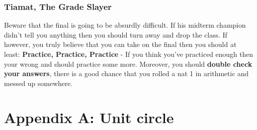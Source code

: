 \documentclass[letterpaper,10pt,twoside,twocolumn,openany]{book}
\begin{document}
\subsection{Tiamat, The Grade Slayer}
Beware that the final is going to be absurdly difficult. If his midterm champion didn't tell you anything then you should turn away and drop the class. If however, you truly believe that you can take on the final then you should at least: \textbf{Practice, Practice, Practice} - If you think you've practiced enough then your wrong and should practice some more. Moreover, you should \textbf{double check your answers}, there is a good chance that you rolled a nat 1 in arithmetic and messed up somewhere.


\onecolumn
\appendix 
\chapter{Appendix A: Unit circle}
\end{document}
